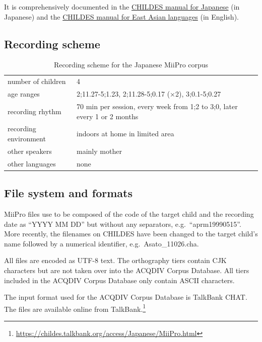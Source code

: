 \documentclass[a4paper, 11pt]{book}
\begin{document}
It is comprehensively documented in the \href{http://www2.aasa.ac.jp/people/smiyata/CHILDESmanual/chapter01.html}{CHILDES manual for Japanese} (in Japanese) and the \href{http://childes.psy.cmu.edu/manuals/10eastasian.pdf}{CHILDES manual for East Asian languages} (in English). 

\subsection{Recording scheme}

\begin{table}[ht]
	\centering
	\begin{tabular}{ll}
		\toprule
		number of children 	& 4 \\
		age ranges 			& 2;11.27-5;1.23, 2;11.28-5;0.17 (×2), 3;0.1-5;0.27 \\
		recording rhythm 	& 70 min per session, every week from 1;2 to 3;0, later every 1 or 2 months \\
		recording environment & indoors at home in limited area \\
		other speakers 		& mainly mother \\
		other languages		& none \\
		\bottomrule
	\end{tabular}
	\caption{Recording scheme for the Japanese MiiPro corpus}
	\label{tab:Japanese MiiPro recording scheme}
\end{table}

\subsection{File system and formats}
MiiPro files use to be composed of the code of the target child and the recording date as “YYYY MM DD” but without any separators, e.g.\ “aprm19990515”. More recently, the filenames on CHILDES have been changed to the target child's name followed by a numerical identifier, e.g.\ Asato\_11026.cha.

All files are encoded as UTF-8 text. The orthography tiers contain CJK characters but are not taken over into the ACQDIV Corpus Database. All tiers included in the ACQDIV Corpus Database only contain ASCII characters. 

The input format used for the ACQDIV Corpus Database is TalkBank CHAT. The files are available online from TalkBank.\footnote{\url{https://childes.talkbank.org/access/Japanese/MiiPro.html}}
\end{document}
